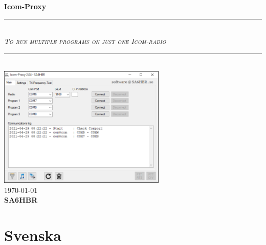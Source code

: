 \documentclass[a4paper]{article}
\begin{document}
\begin{titlepage}
\vspace*{100px}
\newcommand{\HRule}{\rule{\linewidth}{0.5mm}} 	
\center 
 
{ \huge \bfseries Icom-Proxy}
\vspace*{50px}

\HRule \\[0.8cm]

\textsc{\normalsize \emph {To run multiple programs on just one Icom-radio}}\\[0.8cm]

\HRule \\[1cm]

\includegraphics[width=0.6\textwidth]{../image/Icom_Proxy.png}\\[3cm] 

{\large \today}\\[2cm]
\textsc{ \huge \bfseries SA6HBR}\\[1cm]

\vfill 
\end{titlepage}

\pagestyle{fancy}
\fancyhf{}
\lhead{\today}

\cfoot{ \thepage}



\section*{Svenska}
\end{document}
